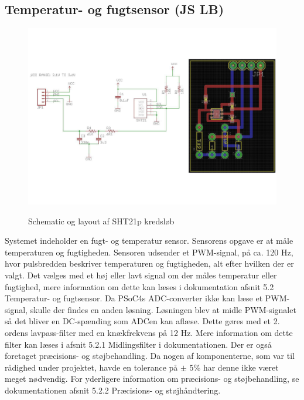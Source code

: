 \subsection{Temperatur- og fugtsensor (JS LB)}


\begin{figure}[htb]
\centering
{\includegraphics[width=\textwidth]{billeder/SHT_pcb}}
\caption{Schematic og layout af SHT21p kredsl\o{}b}
\label{lab:SHT21p-kredsloeb}
\end{figure}

Systemet indeholder  en fugt- og temperatur sensor. Sensorens opgave er at måle temperaturen og fugtigheden.
Sensoren udsender et PWM-signal, på ca. 120 Hz, hvor pulsbredden beskriver temperaturen og fugtigheden,  alt efter hvilken der er valgt. Det vælges med et høj eller lavt signal om der måles temperatur eller fugtighed, mere information om dette kan læses i dokumentation afsnit 5.2 Temperatur- og fugtsensor.
Da PSoC4s ADC-converter ikke kan læse et PWM-signal, skulle der findes en anden løsning. Løsningen blev at midle PWM-signalet så det bliver en DC-spænding som ADCen kan aflæse. Dette gøres med et 2. ordens lavpass-filter med en knækfrekvens på 12 Hz. Mere information om dette filter kan læses i afsnit 5.2.1 Midlingsfilter i dokumentationen. 
Der er også foretaget præcisions- og støjbehandling. Da nogen af komponenterne, som var til rådighed under projektet, havde en tolerance på $\pm$ 5\% har denne ikke været meget nødvendig. For yderligere information om præcisions- og støjbehandling, se dokumentationen afsnit 5.2.2 Præcisions- og støjhåndtering. 